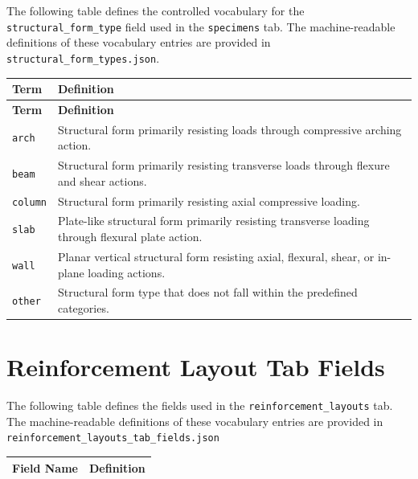 \documentclass[11pt]{book}
\begin{document}
{The following table defines the controlled vocabulary for the \texttt{structural\_form\_type} field used in the \texttt{specimens} tab. The machine-readable definitions of these vocabulary entries are provided in \texttt{structural\_form\_types.json}.

\begin{longtable}{p{}p{}}
\hline
\textbf{Term} & \textbf{Definition} \\
\hline
\endfirsthead

\hline
\textbf{Term} & \textbf{Definition} \\
\hline
\endhead

\texttt{arch} &
Structural form primarily resisting loads through compressive arching action. \\

\texttt{beam} &
Structural form primarily resisting transverse loads through flexure and shear actions. \\

\texttt{column} &
Structural form primarily resisting axial compressive loading. \\

\texttt{slab} &
Plate-like structural form primarily resisting transverse loading through flexural plate action. \\

\texttt{wall} &
Planar vertical structural form resisting axial, flexural, shear, or in-plane loading actions. \\

\texttt{other} &
Structural form type that does not fall within the predefined categories. \\

\hline
\end{longtable}


\section{Reinforcement Layout Tab Fields}
\label{vocab:reinforcement_layouts_fields_tab}

The following table defines the fields used in the \texttt{reinforcement\_layouts} tab. The machine-readable definitions of these vocabulary entries are provided in \texttt{reinforcement\_layouts\_tab\_fields.json}

\begin{longtable}{p{}p{}}
\hline
\textbf{Field Name} & \textbf{Definition} \\
\hline
\endfirsthead


\end{longtable}}
\end{document}
